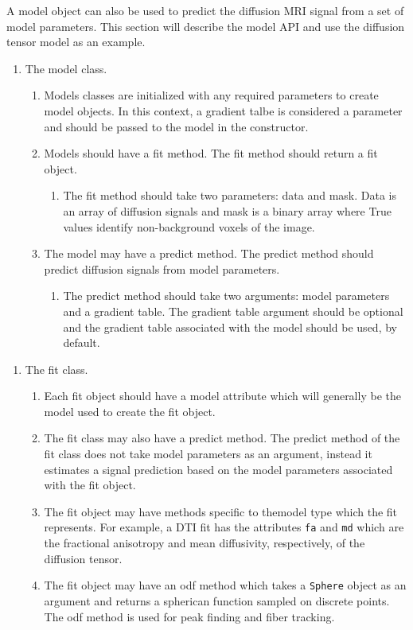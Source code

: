 A model object can also be used to predict the diffusion MRI signal from a set of model parameters. This section will describe the model API and use the diffusion tensor model as an example. 
\begin{enumerate}
\item The model class.
\begin{enumerate}
\item Models classes are initialized with any required parameters to create model objects. In this context, a gradient talbe is considered a parameter and should be passed to the model in the constructor.
\item Models should have a fit method. The fit method should return a fit object.
\begin{enumerate}
\item The fit method should take two parameters: data and mask. Data is an array of diffusion signals and mask is a binary array where True values identify non-background voxels of the image.
\end{enumerate}
\item The model may have a predict method. The predict method should predict diffusion signals from model parameters.
\begin{enumerate}
\item The predict method should take two arguments: model parameters and a gradient table. The gradient table argument should be optional and the gradient table associated with the model should be used, by default.
\end{enumerate}
\end{enumerate}
\end{enumerate}
\begin{enumerate}
    \item The fit class.
    \begin{enumerate}
        \item Each fit object should have a model attribute which will generally be the model used to create the fit object.
        \item The fit class may also have a predict method. The predict method of the fit class does not take model parameters as an argument, instead it estimates a signal prediction based on the model parameters associated with the fit object.
        \item The fit object may have methods specific to themodel type which the fit represents. For example, a DTI fit has the attributes \verb|fa| and \verb|md| which are the fractional anisotropy and mean diffusivity, respectively, of the diffusion tensor.
        \item The fit object may have an odf method which takes a \verb|Sphere| object as an argument and returns a spherican function sampled on discrete points. The odf method is used for peak finding and fiber tracking.
    \end{enumerate}
\end{enumerate}

